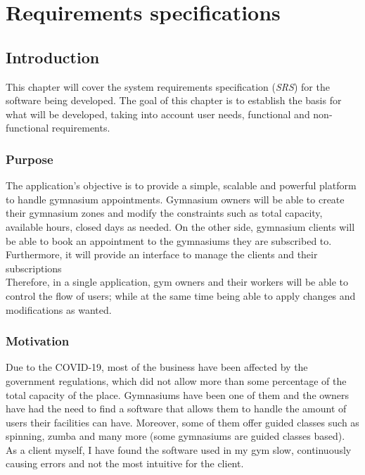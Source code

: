 \documentclass[a4paper, 12pt, oneside]{book}
\begin{document}
\chapter{Requirements specifications}
\section{Introduction}
This chapter will cover the system requirements specification (\emph{SRS}) for the software being developed. The goal of this chapter is to establish the basis for what will be developed, taking into account user needs, functional and non-functional requirements.
\subsection{Purpose}
The application's objective is to provide a simple, scalable and powerful platform to handle gymnasium appointments. Gymnasium owners will be able to create their gymnasium zones and modify the constraints such as total capacity, available hours, closed days as needed. On the other side, gymnasium clients will be able to book an appointment to the gymnasiums they are subscribed to.  Furthermore, it will provide an interface to manage the clients and their subscriptions
\\[8pt]
Therefore, in a single application, gym owners and their workers will be able to control the flow of users; while at the same time being able to apply changes and modifications as wanted.
\subsection{Motivation}
Due to the COVID-19, most of the business have been affected by the government regulations, which did not allow more than some percentage of the total capacity of the place. Gymnasiums have been one of them and the owners have had the need to find a software that allows them to handle the amount of users their facilities can have. Moreover, some of them offer guided classes such as spinning, zumba and many more (some gymnasiums are guided classes based).
\\[8pt]
As a client myself, I have found the software used in my gym slow, continuously causing errors and not the most intuitive for the client.
\end{document}

